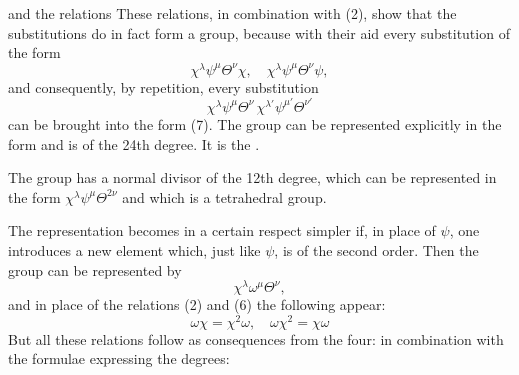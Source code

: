 
and the relations
These relations, in combination with (2), show that the
substitutions
do in fact form a group, because with their aid every
substitution of the form
\[
\chi^{\lambda}\psi^{\mu}\Theta^{\nu}\chi, \quad \chi^{\lambda}\psi^{\mu}\Theta^{\nu}\psi,
\]
and consequently, by repetition, every substitution
\[
\chi^{\lambda}\psi^{\mu}\Theta^{\nu}\,\chi^{\lambda'}\psi^{\mu'}\Theta^{\nu'}
\]
can be brought into the form (7). The group can be represented
explicitly in the form
and is of the 24th degree. It is the
.

The group has a normal divisor of the 12th degree, which can
be represented in the form $\chi^{\lambda}\psi^{\mu}\Theta^{2\nu}$ and which is a
tetrahedral group.

The representation becomes in a certain respect simpler if,
in place of $\psi$, one introduces a new element
which, just like $\psi$, is of the second order. Then
the group can be represented by
\[
\chi^{\lambda}\omega^{\mu}\Theta^{\nu},
\]
and in place of the relations (2) and (6) the following appear:
\[
\omega\chi = \chi^2\omega, \quad \omega\chi^2 = \chi\omega
\]
But all these relations follow as consequences
from the four:
in combination with the formulae expressing the degrees:
